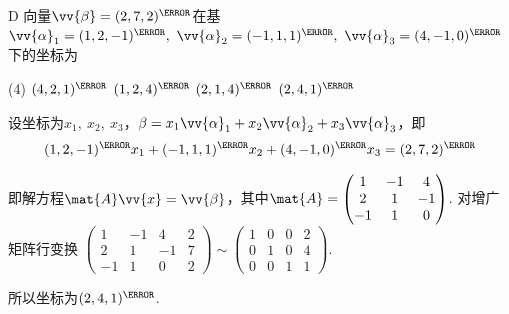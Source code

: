 \begin{choice}{D}
    向量$\vv{\beta}=(2,7,2)^\T$在基$\vv{\alpha}_1=(1,2,-1)^\T,\ \vv{\alpha}_2=(-1,1,1)^\T,\ \vv{\alpha}_3=(4,-1,0)^\T$下的坐标为
\begin{tasks}(4)
    \task $(4,2,1)^\T$
    \task $(1,2,4)^\T$
    \task $(2,1,4)^\T$
    \task $(2,4,1)^\T$
\end{tasks}
\end{choice}
\begin{solution}
    设坐标为$x_1,\ x_2,\ x_3$，$\beta=x_1\vv{\alpha}_1+x_2\vv{\alpha}_2+x_3\vv{\alpha}_3$，即
    \[(1,2,-1)^\T x_1+(-1,1,1)^\T x_2+(4,-1,0)^\T x_3=(2,7,2)^\T\]

    即解方程$\mat{A}\vv{x}=\vv{\beta}$，其中$\mat{A}=\begin{pmatrix}
        1 & -1 & 4\\
        2 & 1 & -1\\
        -1 & 1 & 0
    \end{pmatrix}$. 对增广矩阵行变换
    $\begin{pmatrix}
        1 & -1 & 4 & 2\\
        2 & 1 & -1 & 7\\
        -1 & 1 & 0 & 2
    \end{pmatrix}\sim
    \begin{pmatrix}
        1 & 0 & 0 & 2\\
        0 & 1 & 0 & 4\\
        0 & 0 & 1 & 1
    \end{pmatrix}$.
    
    所以坐标为$(2,4,1)^\T$.
\end{solution}

